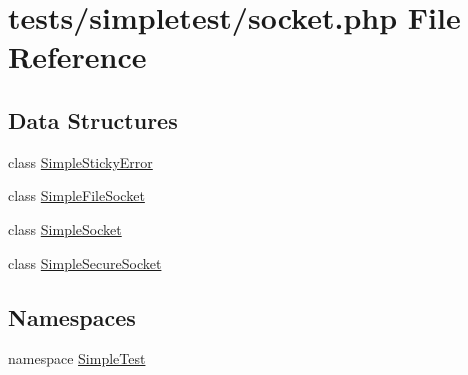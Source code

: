 \hypertarget{socket_8php}{\section{tests/simpletest/socket.php File Reference}
\label{socket_8php}
}
\subsection*{Data Structures}
\begin{DoxyCompactItemize}
\item 
class \hyperlink{class_simple_sticky_error}{Simple\-Sticky\-Error}
\item 
class \hyperlink{class_simple_file_socket}{Simple\-File\-Socket}
\item 
class \hyperlink{class_simple_socket}{Simple\-Socket}
\item 
class \hyperlink{class_simple_secure_socket}{Simple\-Secure\-Socket}
\end{DoxyCompactItemize}
\subsection*{Namespaces}
\begin{DoxyCompactItemize}
\item 
namespace \hyperlink{namespace_simple_test}{Simple\-Test}
\end{DoxyCompactItemize}
